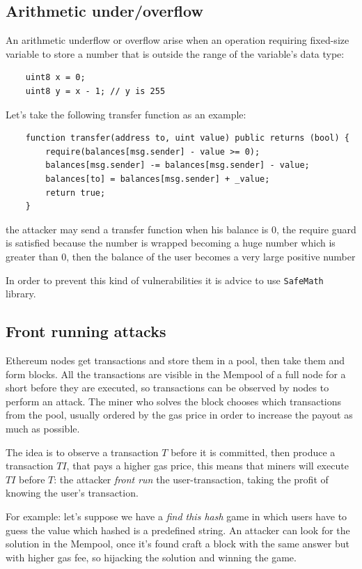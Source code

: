 \subsection{Arithmetic under/overflow}
An arithmetic underflow or overflow arise when an operation requiring fixed-size variable to store a number that is outside the range of the variable's data type:
\begin{verbatim}
    uint8 x = 0;
    uint8 y = x - 1; // y is 255
\end{verbatim}

Let's take the following transfer function as an example:
\begin{verbatim}
    function transfer(address to, uint value) public returns (bool) {
        require(balances[msg.sender] - value >= 0);
        balances[msg.sender] -= balances[msg.sender] - value;
        balances[to] = balances[msg.sender] + _value;
        return true;
    }
\end{verbatim}
the attacker may send a transfer function when his balance is 0, the require guard is satisfied because the number is wrapped becoming a huge number which is greater than 0, then the balance of the user becomes a very large positive number

In order to prevent this kind of vulnerabilities it is advice to use \verb|SafeMath| library.

\subsection{Front running attacks}
Ethereum nodes get transactions and store them in a pool, then take them and form blocks.
All the transactions are visible in the Mempool of a full node for a short before they are executed, so transactions can be observed by nodes to perform an attack.
The miner who solves the block chooses which transactions from the pool, usually ordered by the gas price in order to increase the payout as much as possible.

The idea is to observe a transaction $T$ before it is committed, then produce a transaction $TI$, that pays a higher gas price, this means that miners will execute $TI$ before $T$: the attacker \emph{front run} the user-transaction, taking the profit of knowing the user's transaction.

For example: let's suppose we have a \emph{find this hash} game in which users have to guess the value which hashed is a predefined string.
An attacker can look for the solution in the Mempool, once it's found craft a block with the same answer but with higher gas fee, so hijacking the solution and winning the game.

